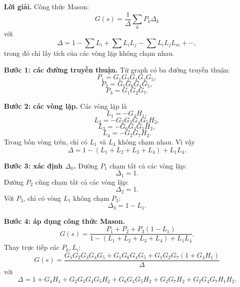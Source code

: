 \documentclass[11pt,a4paper]{article}
\newcommand{\loigiai}{\par\smallskip\noindent\textbf{Lời giải.}\enspace}
\begin{document}
\begin{center}
\end{center}

\loigiai
Công thức Mason:
\[
\boxed{
G(s)=\frac{1}{\Delta}\sum_k P_k\Delta_k
}
\]
với
\[
\Delta
=
1-\sum L_i
+\sum L_iL_j
-\sum L_iL_jL_m+\cdots,
\]
trong đó chỉ lấy tích của các vòng lặp không chạm nhau.

\textbf{Bước 1: các đường truyền thuận.}
Từ graph có ba đường truyền thuận:
\[
P_1=G_1G_2G_3G_4G_5,
\]
\[
P_2=G_1G_6G_4G_5,
\]
\[
P_3=G_1G_2G_7.
\]

\textbf{Bước 2: các vòng lặp.}
Các vòng lặp là
\[
L_1=-G_4H_1,
\]
\[
L_2=-G_2G_3G_4G_5H_2,
\]
\[
L_3=-G_6G_4G_5H_2,
\]
\[
L_4=-G_2G_7H_2.
\]
Trong bốn vòng trên, chỉ có \(L_1\) và \(L_4\) không chạm nhau. Vì vậy
\[
\boxed{
\Delta
=
1-(L_1+L_2+L_3+L_4)+L_1L_4.
}
\]

\textbf{Bước 3: xác định \(\Delta_k\).}
Đường \(P_1\) chạm tất cả các vòng lặp:
\[
\Delta_1=1.
\]
Đường \(P_2\) cũng chạm tất cả các vòng lặp:
\[
\Delta_2=1.
\]
Với \(P_3\), chỉ có vòng \(L_1\) không chạm \(P_3\):
\[
\Delta_3=1-L_1.
\]

\textbf{Bước 4: áp dụng công thức Mason.}
\[
\boxed{
G(s)
=
\frac{
P_1+P_2+P_3(1-L_1)
}{
1-(L_1+L_2+L_3+L_4)+L_1L_4
}.}
\]
Thay trực tiếp các \(P_k,L_i\):
\[
\boxed{
G(s)=
\frac{
G_1G_2G_3G_4G_5
+G_1G_6G_4G_5
+G_1G_2G_7(1+G_4H_1)
}{
\Delta
}
}
\]
với
\[
\Delta=
1+G_4H_1
+G_2G_3G_4G_5H_2
+G_6G_4G_5H_2
+G_2G_7H_2
+G_2G_4G_7H_1H_2.
\]
\end{document}
